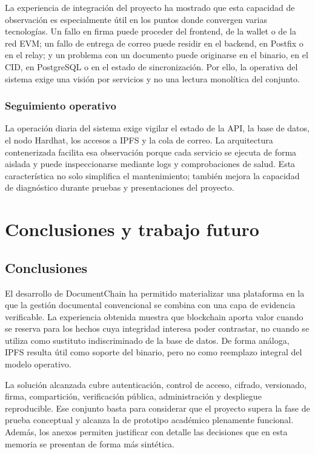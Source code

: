 \documentclass[11pt, a4paper]{article}
\begin{document}
La experiencia de integración del proyecto ha mostrado que esta capacidad de observación es especialmente útil en los puntos donde convergen varias tecnologías. Un fallo en firma puede proceder del frontend, de la wallet o de la red EVM; un fallo de entrega de correo puede residir en el backend, en Postfix o en el relay; y un problema con un documento puede originarse en el binario, en el CID, en PostgreSQL o en el estado de sincronización. Por ello, la operativa del sistema exige una visión por servicios y no una lectura monolítica del conjunto.

\subsubsection{Seguimiento operativo}

La operación diaria del sistema exige vigilar el estado de la API, la base de datos, el nodo Hardhat, los accesos a IPFS y la cola de correo. La arquitectura contenerizada facilita esa observación porque cada servicio se ejecuta de forma aislada y puede inspeccionarse mediante logs y comprobaciones de salud. Esta característica no solo simplifica el mantenimiento; también mejora la capacidad de diagnóstico durante pruebas y presentaciones del proyecto.

\section{Conclusiones y trabajo futuro}

\subsection{Conclusiones}

El desarrollo de DocumentChain ha permitido materializar una plataforma en la que la gestión documental convencional se combina con una capa de evidencia verificable. La experiencia obtenida muestra que blockchain aporta valor cuando se reserva para los hechos cuya integridad interesa poder contrastar, no cuando se utiliza como sustituto indiscriminado de la base de datos. De forma análoga, IPFS resulta útil como soporte del binario, pero no como reemplazo integral del modelo operativo.

La solución alcanzada cubre autenticación, control de acceso, cifrado, versionado, firma, compartición, verificación pública, administración y despliegue reproducible. Ese conjunto basta para considerar que el proyecto supera la fase de prueba conceptual y alcanza la de prototipo académico plenamente funcional. Además, los anexos permiten justificar con detalle las decisiones que en esta memoria se presentan de forma más sintética.
\end{document}

